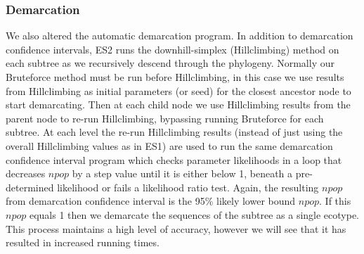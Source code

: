 \subsubsection*{Demarcation}
We also altered the automatic demarcation program.
In addition to demarcation confidence intervals, ES2 runs the downhill-simplex (Hillclimbing) method on each subtree as we recursively descend through the phylogeny.
Normally our Bruteforce method must be run before Hillclimbing, in this case we use results from Hillclimbing as initial parameters (or seed) for the closest ancestor node to start demarcating.
Then at each child node we use Hillclimbing results from the parent node to re-run Hillclimbing, bypassing running Bruteforce for each subtree.
At each level the re-run Hillclimbing results (instead of just using the overall Hillclimbing values as in ES1) are used to run the same demarcation confidence interval program which checks parameter likelihoods in a loop that decreases $npop$ by a step value until it is either below 1, beneath a pre-determined likelihood or fails a likelihood ratio test.
Again, the resulting $npop$ from demarcation confidence interval is the 95\% likely lower bound $npop$.
If this $npop$ equals 1 then we demarcate the sequences of the subtree as a single ecotype.
This process maintains a high level of accuracy, however we will see that it has resulted in increased running times.

